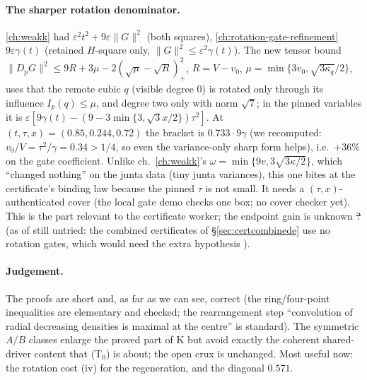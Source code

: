 \paragraph{The sharper rotation denominator.} \autoref{ch:weakk} had $\varepsilon^2t^2+9\varepsilon\|G\|^2$ (both squares), \autoref{ch:rotation-gate-refinement} $9\varepsilon\gamma(t)$ (retained $H$-square only,
$\|G\|^2\le\varepsilon^2\gamma(t)$). The new tensor bound $\|D_pG\|^2\le9R+3\mu-2(\sqrt\mu-\sqrt R)_+^2$, $R=V-v_0$, $\mu=\min\{3v_0,\sqrt{3\kappa_q}/2\}$, uses that the remote cubic $q$ (visible degree $0$)
is rotated only through its influence $I_p(q)\le\mu$, and degree two only with norm $\sqrt7$; in the pinned variables it is $\varepsilon[9\gamma(t)-(9-3\min\{3,\sqrt3x/2\})\tau^2]$. At $(t,\tau,x)=(0.85,0.244,0.72)$
the bracket is $0.733\cdot9\gamma$ (we recomputed: $v_0/V=\tau^2/\gamma=0.34>1/4$, so even the variance-only sharp form helps), i.e.\ $+36\%$ on the gate coefficient. Unlike ch.~\autoref{ch:weakk}'s
$\omega=\min\{9v,3\sqrt{3\kappa/2}\}$, which ``changed nothing'' on the junta data (tiny junta variances), this one bites at the certificate's binding law because the pinned $\tau$ is not small. It needs a
$(\tau,x)$-authenticated cover (the local gate demo checks one box; no cover checker yet). This is the part relevant to the certificate worker; the endpoint gain is unknown \st{?} (as of  still untried: the combined certificates of
\S\ref{sec:certcombinede} use no rotation gates, which would need the extra hypothesis ).

\paragraph{Judgement.} The proofs are short and, as far as we can see, correct (the ring/four-point inequalities are elementary and checked; the rearrangement step ``convolution of radial decreasing
densities is maximal at the centre'' is standard). The symmetric $A/B$ classes enlarge the proved part of K but avoid exactly the coherent shared-driver content that (T$_0$) is about; the open crux
is unchanged. Most useful now: the rotation cost (iv) for the regeneration, and the diagonal $0.571$.
